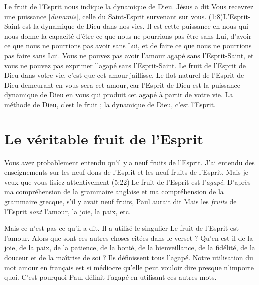\Og Le fruit de l'Esprit \Fg{} nous indique la dynamique de Dieu.
 Jésus a dit\frcolon{} \Og Vous recevrez une puissance [\emph{dunamis}],
 celle du Saint-Esprit survenant sur vous. \Fg{}
 (1:8)L'Esprit-Saint est la dynamique de Dieu dans nos vies.
 Il est cette puissance en nous qui nous donne la capacité
 d'être ce que nous ne pourrions pas être sans Lui,
 d'avoir ce que nous ne pourrions pas avoir sans Lui,
 et de faire ce que nous ne pourrions pas faire sans Lui.
 Vous ne pouvez pas avoir l'amour agapé sans l'Esprit-Saint,
 et vous ne pouvez pas exprimer l'agapé sans l'Esprit-Saint.
 Le fruit de l'Esprit de Dieu dans votre vie, c'est que cet amour jaillisse.
 Le flot naturel de l'Esprit de Dieu demeurant en vous sera cet amour,
 car l'Esprit de Dieu est la puissance dynamique de Dieu
 en vous qui produit cet agapé à partir de votre vie.
 La méthode de Dieu, c'est le fruit ; la dynamique de Dieu, c'est l'Esprit.


\section{Le v\'eritable fruit de l'Esprit}

Vous avez probablement entendu qu'il y a neuf fruits de l'Esprit.
 J'ai entendu des enseignements sur les neuf dons de l'Esprit
 et les neuf fruits de l'Esprit. Mais je veux que vous lisiez
 attentivement (5:22)\frcolon{}
 \Og Le fruit de l'Esprit est l'\emph{agapé}. \Fg{}
 D'après ma compréhension de la grammaire anglaise et
 ma compréhension de la grammaire grecque,
 s'il y avait neuf fruits, Paul aurait dit\frcolon{}
 \Og Mais les \emph{fruits} de l'Esprit \emph{sont} l'amour,
 la joie, la paix, etc. \Fg{}

Mais ce n'est pas ce qu'il a dit. Il a utilisé le singulier\frcolon{}
 \Og Le fruit de l'Esprit est l'amour. \Fg{}
 Alors que sont ces autres choses citées dans le verset ?
 Qu'en est-il de la joie, de la paix, de la patience, de la bonté,
 de la bienveillance, de la fidélité, de la douceur
 et de la maîtrise de soi ? Ils définissent tous l'agapé.
 Notre utilisation du mot \Og amour \Fg{} en français est si médiocre
 qu'elle peut vouloir dire presque n'importe quoi.
 C'est pourquoi Paul définit l'agapé en utilisant ces autres mots.

